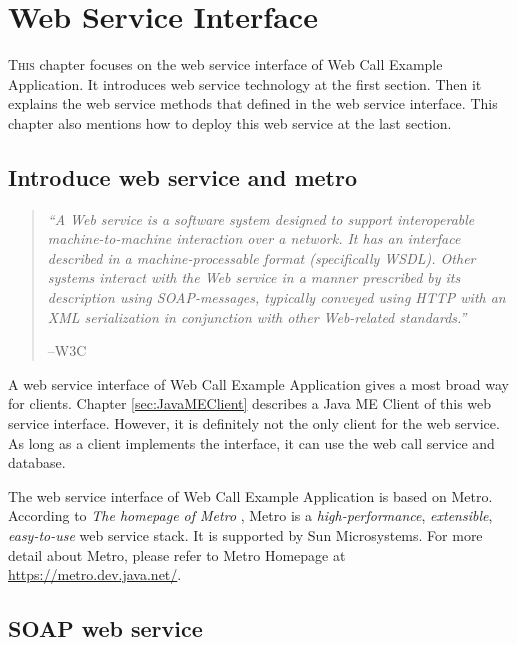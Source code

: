 
\chapter{Web Service Interface}
\label{sec:WebServiceInterface}


\lettrine[lines=3]{T}{his} chapter focuses on the web service interface of \textsf{Web Call Example Application}. It introduces web service technology at the first section. Then it explains the web service methods that defined in the web service interface. This chapter also mentions how to deploy this web service at the last section.

\section{Introduce web service and metro}

\begin{quote}
\textit{``A Web service is a software system designed to support interoperable machine-to-machine interaction over a network. It has an interface described in a machine-processable format (specifically WSDL). Other systems interact with the Web service in a manner prescribed by its description using SOAP-messages, typically conveyed using HTTP with an XML serialization in conjunction with other Web-related standards.''} \cite{WebServicesW3C}
\begin{flushright}
--W3C
\end{flushright}
\end{quote}

A web service interface of Web Call Example Application gives a most broad way for clients. Chapter \ref{sec:JavaMEClient} describes a Java ME Client of this web service interface. However, it is definitely not the only client for the web service. As long as a client implements the interface, it can use the web call service and database. 

The web service interface of Web Call Example Application is based on \textsf{Metro}. According to \textit{The homepage of Metro} \cite{MetroHomepage}, Metro is a \textit{high-performance}, \textit{extensible}, \textit{easy-to-use} web service stack. It is supported by Sun Microsystems. For more detail about Metro, please refer to Metro Homepage at \href{https://metro.dev.java.net/}{https://metro.dev.java.net/}. 

\section{SOAP web service}

